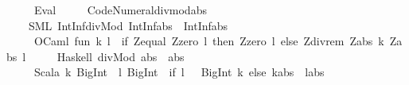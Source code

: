 \begin{isabellebody}
\ \ \ \ \ {\isacharparenleft}{\kern0pt}Eval{\isacharparenright}{\kern0pt}\ \ {}\ {\isachardoublequoteopen}{\isacharasterisk}{\kern0pt}{\isachardoublequoteclose}\isanewline
{\isacharbar}{\kern0pt}\ \ Code{\isacharunderscore}{\kern0pt}Numeral{\isachardot}{\kern0pt}divmod{\isacharunderscore}{\kern0pt}abs\ {\isasymrightharpoonup}\isanewline
\ \ \ \ {\isacharparenleft}{\kern0pt}SML{\isacharparenright}{\kern0pt}\ {\isachardoublequoteopen}IntInf{\isachardot}{\kern0pt}divMod{\isacharslash}{\kern0pt}\ {\isacharparenleft}{\kern0pt}IntInf{\isachardot}{\kern0pt}abs\ {\isacharunderscore}{\kern0pt}{\isacharcomma}{\kern0pt}{\isacharslash}{\kern0pt}\ IntInf{\isachardot}{\kern0pt}abs\ {\isacharunderscore}{\kern0pt}{\isacharparenright}{\kern0pt}{\isachardoublequoteclose}\isanewline
\ \ \ \ \ {\isacharparenleft}{\kern0pt}OCaml{\isacharparenright}{\kern0pt}\ {\isachardoublequoteopen}{\isacharbang}{\kern0pt}{\isacharparenleft}{\kern0pt}fun\ k\ l\ {\isacharminus}{\kern0pt}{\isachargreater}{\kern0pt}{\isacharslash}{\kern0pt}\ if\ Z{\isachardot}{\kern0pt}equal\ Z{\isachardot}{\kern0pt}zero\ l\ then{\isacharslash}{\kern0pt}\ {\isacharparenleft}{\kern0pt}Z{\isachardot}{\kern0pt}zero{\isacharcomma}{\kern0pt}\ l{\isacharparenright}{\kern0pt}\ else{\isacharslash}{\kern0pt}\ Z{\isachardot}{\kern0pt}div{\isacharprime}{\kern0pt}{\isacharunderscore}{\kern0pt}rem{\isacharslash}{\kern0pt}\ {\isacharparenleft}{\kern0pt}Z{\isachardot}{\kern0pt}abs\ k{\isacharparenright}{\kern0pt}{\isacharslash}{\kern0pt}\ {\isacharparenleft}{\kern0pt}Z{\isachardot}{\kern0pt}abs\ l{\isacharparenright}{\kern0pt}{\isacharparenright}{\kern0pt}{\isachardoublequoteclose}\isanewline
\ \ \ \ \ {\isacharparenleft}{\kern0pt}Haskell{\isacharparenright}{\kern0pt}\ {\isachardoublequoteopen}divMod{\isacharslash}{\kern0pt}\ {\isacharparenleft}{\kern0pt}abs\ {\isacharunderscore}{\kern0pt}{\isacharparenright}{\kern0pt}{\isacharslash}{\kern0pt}\ {\isacharparenleft}{\kern0pt}abs\ {\isacharunderscore}{\kern0pt}{\isacharparenright}{\kern0pt}{\isachardoublequoteclose}\isanewline
\ \ \ \ \ {\isacharparenleft}{\kern0pt}Scala{\isacharparenright}{\kern0pt}\ {\isachardoublequoteopen}{\isacharbang}{\kern0pt}{\isacharparenleft}{\kern0pt}{\isacharparenleft}{\kern0pt}k{\isacharcolon}{\kern0pt}\ BigInt{\isacharparenright}{\kern0pt}\ {\isacharequal}{\kern0pt}{\isachargreater}{\kern0pt}\ {\isacharparenleft}{\kern0pt}l{\isacharcolon}{\kern0pt}\ BigInt{\isacharparenright}{\kern0pt}\ {\isacharequal}{\kern0pt}{\isachargreater}{\kern0pt}{\isacharslash}{\kern0pt}\ if\ {\isacharparenleft}{\kern0pt}l\ {\isacharequal}{\kern0pt}{\isacharequal}{\kern0pt}\ {}{\isacharparenright}{\kern0pt}{\isacharslash}{\kern0pt}\ {\isacharparenleft}{\kern0pt}BigInt{\isacharparenleft}{\kern0pt}{}{\isacharparenright}{\kern0pt}{\isacharcomma}{\kern0pt}\ k{\isacharparenright}{\kern0pt}\ else{\isacharslash}{\kern0pt}\ {\isacharparenleft}{\kern0pt}k{\isachardot}{\kern0pt}abs\ {\isacharprime}{\kern0pt}{\isacharslash}{\kern0pt}{\isacharpercent}{\kern0pt}\ l{\isachardot}{\kern0pt}abs{\isacharparenright}{\kern0pt}{\isacharparenright}{\kern0pt}{\isachardoublequoteclose}\isanewline

\end{isabellebody}
